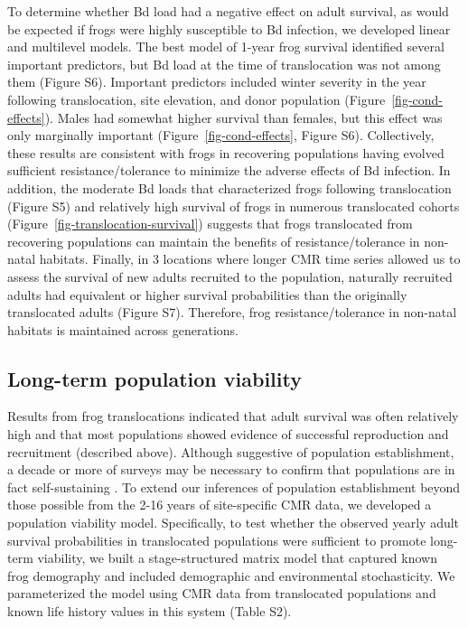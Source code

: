 \documentclass[9pt,twocolumn,twoside,lineno]{pnas-new}
\begin{document}
To determine whether Bd load had a negative effect on adult survival, as
would be expected if frogs were highly susceptible to Bd infection, we
developed linear and multilevel models. The best model of 1-year frog
survival identified several important predictors, but Bd load at the
time of translocation was not among them
(Figure S6). Important predictors included
winter severity in the year following translocation, site elevation, and
donor population (Figure~\ref{fig-cond-effects}). Males had somewhat
higher survival than females, but this effect was only marginally
important (Figure~\ref{fig-cond-effects},
Figure S6). Collectively, these results are
consistent with frogs in recovering populations having evolved
sufficient resistance/tolerance to minimize the adverse effects of Bd
infection. In addition, the moderate Bd loads that characterized frogs
following translocation (Figure S5) and
relatively high survival of frogs in numerous translocated cohorts
(Figure~\ref{fig-translocation-survival}) suggests that frogs
translocated from recovering populations can maintain the benefits of
resistance/tolerance in non-natal habitats. Finally, in 3 locations
where longer CMR time series allowed us to assess the survival of new
adults recruited to the population, naturally recruited adults had
equivalent or higher survival probabilities than the originally
translocated adults (Figure S7). Therefore,
frog resistance/tolerance in non-natal habitats is maintained across
generations.

\subsection*{Long-term population viability}

Results from frog translocations indicated that adult survival was often
relatively high and that most populations showed evidence of successful
reproduction and recruitment (described above). Although suggestive of
population establishment, a decade or more of surveys may be necessary
to confirm that populations are in fact self-sustaining
\citep{joseph2018}. To extend our inferences of population establishment
beyond those possible from the 2-16 years of site-specific CMR data, we
developed a population viability model. Specifically, to test whether
the observed yearly adult survival probabilities in translocated
populations were sufficient to promote long-term viability, we built a
stage-structured matrix model that captured known frog demography and
included demographic and environmental stochasticity. We parameterized
the model using CMR data from translocated populations and known life
history values in this system (Table S2).
\end{document}
